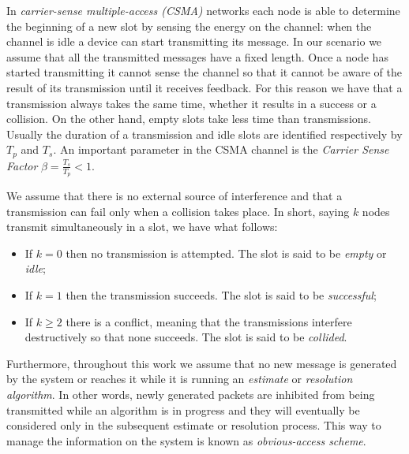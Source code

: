 \documentclass[11pt,a4paper,twoside,openright]{book}
\newcommand{\rev}[1]{\textcolor{Cerulean}{#1}}
\begin{document}
\rev{
In \emph{carrier-sense multiple-access (CSMA)} networks each node is able to determine the beginning of a new slot by sensing the energy on the channel: when the channel is idle a device can start transmitting its message. In our scenario we assume that all the transmitted messages have a fixed length. Once a node has started transmitting it cannot sense the channel so that it cannot be aware of the result of its transmission until it receives feedback. For this reason we have that a transmission always takes the same time, whether it results in a success or a collision. On the other hand, empty slots take less time than transmissions. Usually the duration of a transmission and idle slots are identified respectively by $T_{p}$ and $T_{s}$. An important parameter in the CSMA channel is the \emph{Carrier Sense Factor} $\beta={\displaystyle\frac{T_{s}}{T_{p}}<1}$.\\}

We assume that there is no external source of interference and that a transmission can fail only when a collision takes place.
In short, saying $k$ nodes transmit simultaneously in a slot, we have what follows:
\begin{itemize}
\item If $k=0$ then no transmission is attempted. The slot is said to be \emph{empty} or \emph{idle};
\item If $k=1$ then the transmission succeeds. The slot is said to be \emph{successful};
\item If $k\geq 2$ there is a conflict, meaning that the transmissions interfere destructively so that none succeeds. The slot is said to be \emph{collided}.\\
\end{itemize}

\rev{
Furthermore, throughout this work we assume that no new message is generated by the system or reaches it while it is running an \emph{estimate} or \emph{resolution algorithm}. In other words, newly generated packets are inhibited from being transmitted while an algorithm is in progress and they will eventually be considered only in the subsequent estimate or resolution process. This way to manage the information on the system is known as \emph{obvious-access scheme}.\\}
\end{document}
